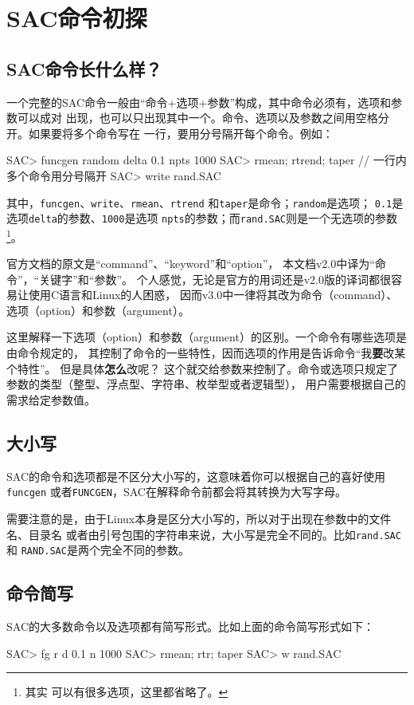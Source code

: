 \section{SAC命令初探}
\subsection{SAC命令长什么样？}
一个完整的SAC命令一般由``命令+选项+参数''构成，其中命令必须有，选项和参数可以成对
出现，也可以只出现其中一个。命令、选项以及参数之间用空格分开。如果要将多个命令写在
一行，要用分号隔开每个命令。例如：
\begin{SACCode}
SAC> funcgen random delta 0.1 npts 1000
SAC> rmean; rtrend; taper                 // 一行内多个命令用分号隔开
SAC> write rand.SAC
\end{SACCode}
其中，\lstinline{funcgen}、\lstinline{write}、\lstinline{rmean}、\lstinline{rtrend}
和\lstinline{taper}是命令；\lstinline{random}是选项；
\lstinline{0.1}是选项\lstinline{delta}的参数、\lstinline{1000}是选项
\lstinline{npts}的参数；而\lstinline{rand.SAC}则是一个无选项的参数\footnote{其实
可以有很多选项，这里都省略了。}。

\begin{Tips}
官方文档的原文是``command''、``keyword''和``option''，
本文档v2.0中译为``命令''，``关键字''和``参数''。
个人感觉，无论是官方的用词还是v2.0版的译词都很容易让使用C语言和Linux的人困惑，
因而v3.0中一律将其改为命令（command）、选项（option）和参数（argument）。

这里解释一下选项（option）和参数（argument）的区别。一个命令有哪些选项是由命令规定的，
其控制了命令的一些特性，因而选项的作用是告诉命令``我\textbf{要}改某个特性''。
但是具体\textbf{怎么}改呢？
这个就交给参数来控制了。命令或选项只规定了参数的类型（整型、浮点型、字符串、枚举型或者逻辑型），
用户需要根据自己的需求给定参数值。
\end{Tips}

\subsection{大小写}
SAC的命令和选项都是不区分大小写的，这意味着你可以根据自己的喜好使用\lstinline{funcgen}
或者\lstinline{FUNCGEN}，SAC在解释命令前都会将其转换为大写字母。

需要注意的是，由于Linux本身是区分大小写的，所以对于出现在参数中的文件名、目录名
或者由引号包围的字符串来说，大小写是完全不同的。比如\lstinline{rand.SAC}和
\lstinline{RAND.SAC}是两个完全不同的参数。

\subsection{命令简写}
SAC的大多数命令以及选项都有简写形式。比如上面的命令简写形式如下：
\begin{SACCode}
SAC> fg r d 0.1 n 1000
SAC> rmean; rtr; taper
SAC> w rand.SAC
\end{SACCode}

